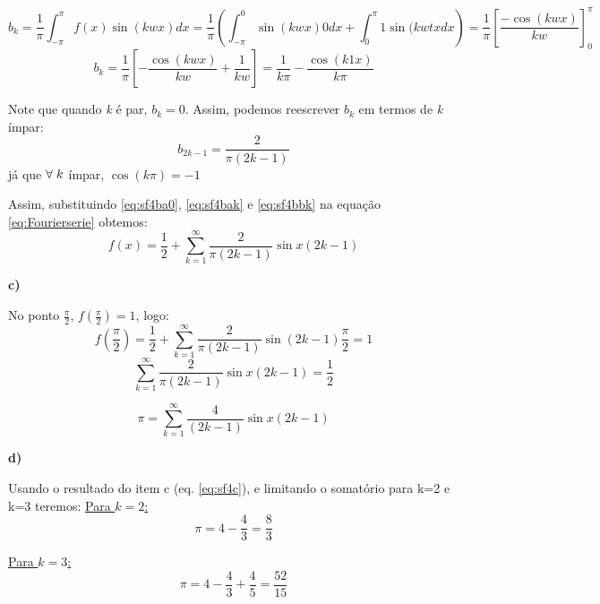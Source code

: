 \begin{equation*}
    b_k = \frac{1}{\pi}\int_{-\pi}^\pi f(x)\sin{(kwx)}dx = \frac{1}{\pi}\left(\int_{-\pi}^0\sin{(kwx)} 0dx + \int_0^\pi 1\sin{(kwtx}dx\right) = \frac{1}{\pi}\left[\frac{-\cos{(kwx)}}{kw}\right]^\pi_0
\end{equation*}
\begin{equation*}
    b_k = \frac{1}{\pi}\left[-\frac{\cos{(kwx)}}{kw} + \frac{1}{kw}\right] = \frac{1}{k\pi} -\frac{\cos{(k1x)}}{k\pi}
\end{equation*}

Note que quando \textit{k} é par, $b_k = 0$. Assim, podemos reescrever $b_k$ em termos de \textit{k} ímpar:
\begin{equation}
    \label{eq:sf4bbk}
    b_{2k-1} = \frac{2}{\pi(2k-1)}
\end{equation}
já que $\forall \hspace{0.1cm} k$ ímpar, $\cos{(k\pi)}= -1$

Assim, substituindo \ref{eq:sf4ba0}, \ref{eq:sf4bak} e \ref{eq:sf4bbk} na equação \ref{eq:Fourierserie} obtemos:
\begin{equation*}
    \boxed{f(x) = \frac{1}{2} + \sum_{k=1}^\infty \frac{2}{\pi(2k-1)}\sin{x(2k-1)}}
\end{equation*}

\textbf{c)}

No ponto $\frac{\pi}{2}$, $f(\frac{\pi}{2}) = 1$, logo:
\begin{equation*}
    f(\frac{\pi}{2}) = \frac{1}{2} + \sum_{k=1}^\infty \frac{2}{\pi(2k-1)}\sin{(2k-1)\frac{\pi}{2}} = 1
\end{equation*}
\begin{equation*}
    \sum_{k=1}^\infty \frac{2}{\pi(2k-1)}\sin{x(2k-1)} = \frac{1}{2}
\end{equation*}

\begin{equation}
    \label{eq:sf4c}
    \boxed{\pi = \sum_{k=1}^\infty \frac{4}{(2k-1)}\sin{x(2k-1)}}
\end{equation}

\textbf{d)}

Usando o resultado do item c (eq. \ref{eq:sf4c}), e limitando o somatório para k=2 e k=3 teremos:
\underline{Para $k = 2$:}
\begin{equation*}
    \pi = 4 - \frac{4}{3} = \frac{8}{3}
\end{equation*}

\underline{Para $k = 3$:}
\begin{equation*}
    \pi = 4 - \frac{4}{3} + \frac{4}{5} = \frac{52}{15}
\end{equation*}

